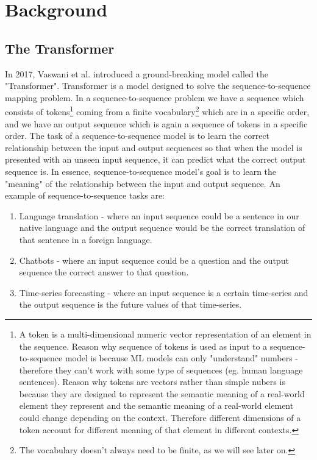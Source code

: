 \section{Background} 

\subsection{The Transformer}

In 2017, Vaswani et al. \cite{vaswani2017attention} introduced a ground-breaking model called the "Transformer". Transformer is a model designed to solve the sequence-to-sequence mapping problem. In a sequence-to-sequence problem we have a sequence which consists of tokens\footnote{A token is a multi-dimensional numeric vector representation of an element in the sequence. Reason why sequence of tokens is used as input to a sequence-to-sequence model is because ML models can only "understand" numbers - therefore they can't work with some type of sequences (eg. human language sentences). Reason why tokens are vectors rather than simple nubers is because they are designed to represent the semantic meaning of a real-world element they represent and the semantic meaning of a real-world element could change depending on the context. Therefore different dimensions of a token account for different meaning of that element in different contexts.} coming from a finite vocabulary\footnote{The vocabulary doesn't always need to be finite, as we will see later on.} which are in a specific order, and we have an output sequence which is again a sequence of tokens in a specific order. The task of a sequence-to-sequence model is to learn the correct relationship between the input and output sequences so that when the model is presented with an unseen input sequence, it can predict what the correct output sequence is. In essence, sequence-to-sequence model's goal is to learn the "meaning" of the relationship between the input and output sequence. An example of sequence-to-sequence tasks are:
\begin{enumerate}
    \item Language translation - where an input sequence could be a sentence in our native language and the output sequence would be the correct translation of that sentence in a foreign language.
    \item Chatbots - where an input sequence could be a question and the output sequence the correct answer to that question.
    \item Time-series forecasting - where an input sequence is a certain time-series and the output sequence is the future values of that time-series. 
\end{enumerate}

